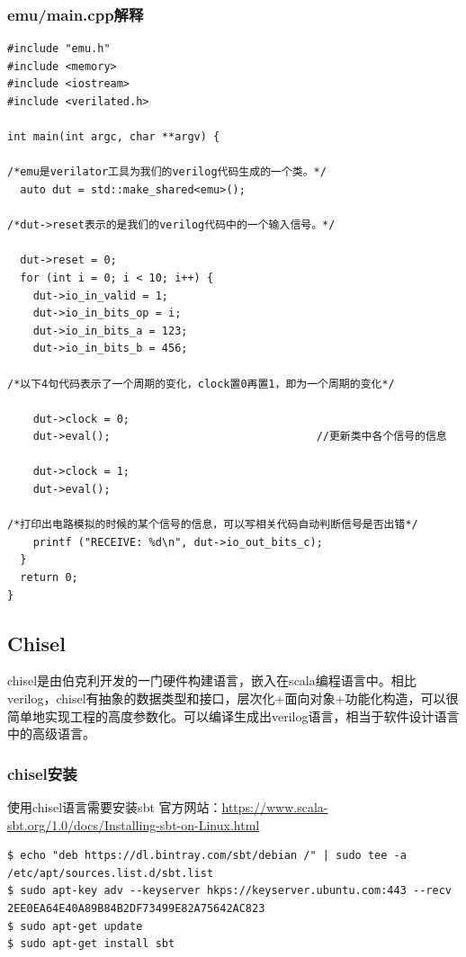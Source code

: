 \documentclass[lang=cn,11pt,a4paper]{elegantpaper}
\begin{document}
\subsubsection{emu/main.cpp解释}
\begin{lstlisting}
#include "emu.h"
#include <memory>
#include <iostream>
#include <verilated.h>

int main(int argc, char **argv) {

/*emu是verilator工具为我们的verilog代码生成的一个类。*/
  auto dut = std::make_shared<emu>();	

/*dut->reset表示的是我们的verilog代码中的一个输入信号。*/

  dut->reset = 0;					
  for (int i = 0; i < 10; i++) {
    dut->io_in_valid = 1;
    dut->io_in_bits_op = i;
    dut->io_in_bits_a = 123;
    dut->io_in_bits_b = 456;

/*以下4句代码表示了一个周期的变化，clock置0再置1，即为一个周期的变化*/

    dut->clock = 0;							
    dut->eval();								//更新类中各个信号的信息

    dut->clock = 1;
    dut->eval();

/*打印出电路模拟的时候的某个信号的信息，可以写相关代码自动判断信号是否出错*/
	printf ("RECEIVE: %d\n", dut->io_out_bits_c);
  }
  return 0;
}
\end{lstlisting}

\subsection{Chisel}
chisel是由伯克利开发的一门硬件构建语言，嵌入在scala编程语言中。相比verilog，chisel有抽象的数据类型和接口，层次化+面向对象+功能化构造，可以很简单地实现工程的高度参数化。可以编译生成出verilog语言，相当于软件设计语言中的高级语言。

\subsubsection{chisel安装}
使用chisel语言需要安装sbt
官方网站：\url{https://www.scala-sbt.org/1.0/docs/Installing-sbt-on-Linux.html}

\begin{lstlisting}
$ echo "deb https://dl.bintray.com/sbt/debian /" | sudo tee -a /etc/apt/sources.list.d/sbt.list
$ sudo apt-key adv --keyserver hkps://keyserver.ubuntu.com:443 --recv 2EE0EA64E40A89B84B2DF73499E82A75642AC823
$ sudo apt-get update
$ sudo apt-get install sbt
\end{lstlisting}
\end{document}
